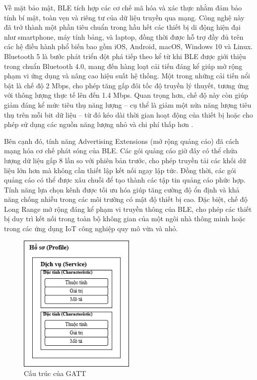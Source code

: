 Về mặt bảo mật, BLE tích hợp các cơ chế mã hóa và xác thực nhằm đảm bảo 
tính bí mật, toàn vẹn và riêng tư của dữ liệu truyền qua mạng. 
Công nghệ này đã trở thành một phần tiêu chuẩn trong hầu hết các 
thiết bị di động hiện đại như smartphone, máy tính bảng, và laptop, 
đồng thời được hỗ trợ đầy đủ trên các hệ điều hành phổ biến bao gồm iOS, 
Android, macOS, Windows 10 và Linux. Bluetooth 5 là bước phát triển 
đột phá tiếp theo kể từ khi BLE được giới thiệu trong chuẩn Bluetooth 
4.0, mang đến hàng loạt cải tiến đáng kể giúp mở rộng phạm vi ứng dụng 
và nâng cao hiệu suất hệ thống. Một trong những cải tiến nổi bật là 
chế độ 2 Mbps, cho phép tăng gấp đôi tốc độ truyền lý thuyết, tương 
ứng với thông lượng thực tế lên đến 1.4 Mbps. Quan trọng hơn, chế độ 
này còn giúp giảm đáng kể mức tiêu thụ năng lượng – cụ thể là giảm một 
nửa năng lượng tiêu thụ trên mỗi bit dữ liệu – từ đó kéo dài thời gian 
hoạt động của thiết bị hoặc cho phép sử dụng các nguồn năng lượng nhỏ 
và chi phí thấp hơn \cite{BLE}. 

Bên cạnh đó, tính năng Advertising Extensions (mở rộng quảng cáo) đã 
cách mạng hóa cơ chế phát sóng của BLE. Các gói quảng cáo giờ đây có 
thể chứa lượng dữ liệu gấp 8 lần so với phiên bản trước, cho phép 
truyền tải các khối dữ liệu lớn hơn mà không cần thiết lập kết nối 
ngay lập tức. Đồng thời, các gói quảng cáo có thể được xâu chuỗi 
để tạo thành các tập tin quảng cáo phức hợp. Tính năng lựa chọn kênh 
được tối ưu hóa giúp tăng cường độ ổn định và khả năng chống nhiễu 
trong các môi trường có mật độ thiết bị cao. Đặc biệt, chế độ Long 
Range mở rộng đáng kể phạm vi truyền thông của BLE, cho phép các thiết 
bị duy trì kết nối trong toàn bộ không gian của một ngôi nhà thông minh 
hoặc trong các ứng dụng IoT công nghiệp quy mô vừa và nhỏ.




\begin{figure}[htbp]
	\centering
 	\includegraphics[width=0.5\textwidth]{images/gatt.drawio.png}
	\caption{Cấu trúc của GATT}
	\label{gatt}
\end{figure}

